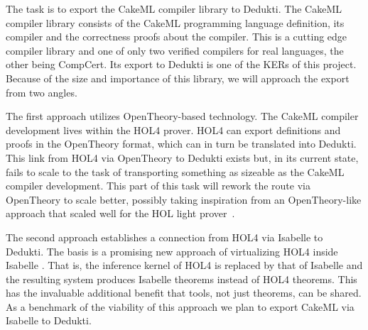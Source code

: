 \begin{workpackage}[id=libraries,wphases=0-48,type=RTD,
  short=Libraries,%
  title=Libraries,
  lead=Inr,
  InrRM=10,
  TumRM=36]
\begin{tasklist}
\begin{task}[id=cakeml,title=The CakeML compiler library]
The task is to export the CakeML compiler library to Dedukti.  The
CakeML compiler library consists of the CakeML programming language
definition, its compiler and the correctness proofs about the
compiler. This is a cutting edge compiler library and one of only two
verified compilers for real languages, the other being CompCert. Its
export to Dedukti is one of the KERs of this project. Because of the
size and importance of this library, we will approach the export from
two angles.

The first approach utilizes OpenTheory-based technology. The CakeML
compiler development lives within the HOL4 prover. HOL4 can export
definitions and proofs in the OpenTheory format, which can in turn be
translated into Dedukti. This link from HOL4 via OpenTheory to Dedukti
exists but, in its current state, fails to scale to the task of
transporting something as sizeable as the CakeML compiler
development. This part of this task will rework the route via
OpenTheory to scale better, possibly taking inspiration from an
OpenTheory-like approach that scaled well for the HOL light
prover~\cite{KaliszyKrauss}.

The second approach establishes a connection from HOL4 via Isabelle to
Dedukti. The basis is a promising new approach of virtualizing HOL4
inside Isabelle \cite{ImmlerRaedleWenzel}. That is, the inference
kernel of HOL4 is replaced by that of Isabelle and the resulting
system produces Isabelle theorems instead of HOL4 theorems. This has
the invaluable additional benefit that tools, not just theorems, can
be shared. As a benchmark of the viability of this approach we plan to
export CakeML via Isabelle to Dedukti.
\end{task}

\begin{task}[id=unimath,title=The UniMath library]
\end{task}


\end{tasklist}


\end{workpackage}
